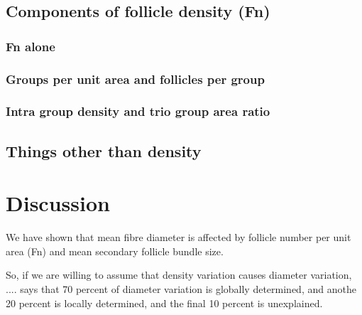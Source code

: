 \documentclass[titlepage]{article}  %
\begin{document}
\subsection{Components of follicle density (Fn)}
\subsubsection{Fn alone}
\subsubsection{Groups per unit area and follicles per group}
\subsubsection{Intra group density and trio group area ratio}

\subsection{Things other than density}


\clearpage
\section{Discussion}
We have shown that mean fibre diameter is affected by follicle number per unit area (Fn) and mean secondary follicle bundle size. 

So, if we are willing to assume that density variation causes diameter variation,  .... says that 70 percent of diameter variation is globally determined, and anothe 20 percent is locally determined, and the final 10 percent is unexplained. 



\clearpage
\end{document}

